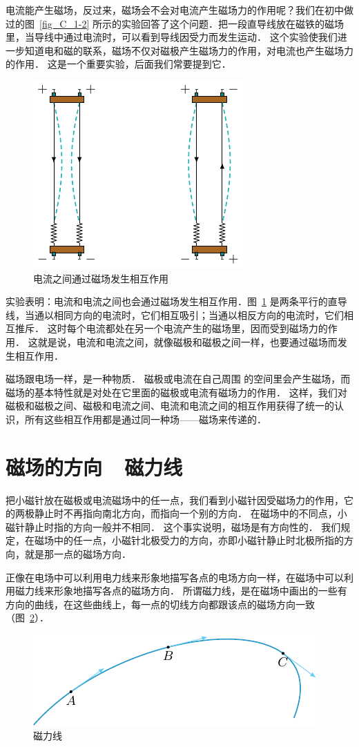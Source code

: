 电流能产生磁场，反过来，磁场会不会对电流产生磁场力的作用呢？我们在初中做过的图~\ref{fig_C_1-2} 所示的实验回答了这个问题．把一段直导线放在磁铁的磁场里，当导线中通过电流时，可以看到导线因受力而发生运动．
这个实验使我们进一步知道电和磁的联系，磁场不仅对磁极产生磁场力的作用，对电流也产生磁场力的作用．
这是一个重要实验，后面我们常要提到它．

\begin{figure}[htbp]
    \centering
    \includegraphics{fig/C/1-3.pdf}
    \caption{电流之间通过磁场发生相互作用}\label{fig_C_1-3}
\end{figure}

实验表明：电流和电流之间也会通过磁场发生相互作用．图~\ref{fig_C_1-3} 是两条平行的直导线，当通以相同方向的电流时，它们相互吸引；当通以相反方向的电流时，它们相互推斥．
这时每个电流都处在另一个电流产生的磁场里，因而受到磁场力的作用．
这就是说，电流和电流之间，就像磁极和磁极之间一样，也要通过磁场而发生相互作用．

磁场跟电场一样，是一种物质．
磁极或电流在自己周围
的空间里会产生磁场，而磁场的基本特性就是对处在它里面的磁极或电流有磁场力的作用．
这样，我们对磁极和磁极之间、磁极和电流之间、电流和电流之间的相互作用获得了统一的认识，所有这些相互作用都是通过同一种场——磁场来传递的．

\section{磁场的方向~~磁力线}
把小磁针放在磁极或电流磁场中的任一点，我们看到小磁针因受磁场力的作用，它的两极静止时不再指向南北方向，而指向一个别的方向．
在磁场中的不同点，小磁针静止时指的方向一般并不相同．
这个事实说明，磁场是有方向性的．
我们规定，在磁场中的任一点，小磁针北极受力的方向，亦即小磁针静止时北极所指的方向，就是那一点的磁场方向．

正像在电场中可以利用电力线来形象地描写各点的电场方向一样，在磁场中可以利用磁力线来形象地描写各点的磁场方向．
所谓磁力线，是在磁场中画出的一些有方向的曲线，在这些曲线上，每一点的切线方向都跟该点的磁场方向一致（图~\ref{fig_C_1-4}）．
\begin{figure}[htbp]
    \centering
    \includegraphics{fig/C/1-4.pdf}
    \caption{磁力线}\label{fig_C_1-4}
\end{figure}

